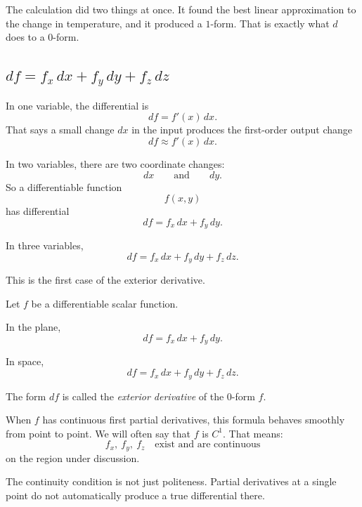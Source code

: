 The calculation did two things at once.  It found the best linear approximation to the
change in temperature, and it produced a \(1\)-form.  That is exactly what \(d\) does to a
\(0\)-form.

\subsection{\texorpdfstring{\(df=f_x\,dx+f_y\,dy+f_z\,dz\)}{df = fx dx + fy dy + fz dz}}

In one variable, the differential is
\[
    df=f'(x)\,dx.
\]
That says a small change \(dx\) in the input produces the first-order output change
\[
    df\approx f'(x)\,dx.
\]

In two variables, there are two coordinate changes:
\[
    dx
    \qquad\text{and}\qquad
    dy.
\]
So a differentiable function
\[
    f(x,y)
\]
has differential
\[
\boxed{
    df=f_x\,dx+f_y\,dy.
}
\]

In three variables,
\[
\boxed{
    df=f_x\,dx+f_y\,dy+f_z\,dz.
}
\]

This is the first case of the exterior derivative.

\begin{definition}
Let \(f\) be a differentiable scalar function.

In the plane,
\[
\boxed{
    d f=f_x\,dx+f_y\,dy.
}
\]

In space,
\[
\boxed{
    d f=f_x\,dx+f_y\,dy+f_z\,dz.
}
\]

The form \(df\) is called the \emph{exterior derivative} of the \(0\)-form \(f\).
\end{definition}

When \(f\) has continuous first partial derivatives, this formula behaves smoothly from
point to point.  We will often say that \(f\) is \(C^1\).  That means:
\[
    f_x,\ f_y,\ f_z
    \quad\text{exist and are continuous}
\]
on the region under discussion.

The continuity condition is not just politeness.  Partial derivatives at a single point do
not automatically produce a true differential there.

